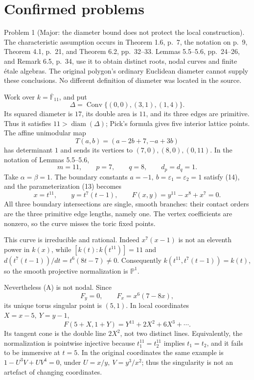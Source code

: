 \documentclass[10pt]{article}
\begin{document}
\section*{Confirmed problems}
Problem 1 (Major: the diameter bound does not protect the local construction).  The characteristic assumption occurs in Theorem 1.6, p. 7, the notation on p. 9, Theorem 4.1, p. 21, and Theorem 6.2, pp. 32–33. Lemmas 5.5–5.6, pp. 24–26, and Remark 6.5, p. 34, use it to obtain distinct roots, nodal curves and finite étale algebras. The original polygon’s ordinary Euclidean diameter cannot supply these conclusions. No different definition of diameter was located in the source.\par
Work over \(k=\overline{\mathbb F}_{11}\), and put \[\Delta=\operatorname{Conv}\{(0,0),(3,1),(1,4)\}.\] Its squared diameter is \(17\), its double area is \(11\), and its three edges are primitive. Thus it satisfies \(11>\operatorname{diam}(\Delta)\); Pick’s formula gives five interior lattice points. The affine unimodular map \[T(a,b)=(a-2b+7,-a+3b)\] has determinant \(1\) and sends its vertices to \((7,0),(8,0),(0,11)\). In the notation of Lemmas 5.5–5.6, \[m=11,\qquad p=7,\qquad q=8,\qquad d_p=d_q=1.\] Take \(\alpha=\beta=1\). The boundary constants \(a=-1,\ b=\varepsilon_1=\varepsilon_2=1\) satisfy (14), and the parameterization (13) becomes \[x=t^{11},\qquad y=t^7(t-1),\qquad
 F(x,y)=y^{11}-x^8+x^7=0.                         \tag{A}\] All three boundary intersections are single, smooth branches: their contact orders are the three primitive edge lengths, namely one. The vertex coefficients are nonzero, so the curve misses the toric fixed points.\par
This curve is irreducible and rational. Indeed \(x^7(x-1)\) is not an eleventh power in \(k(x)\), while \([k(t):k(t^{11})]=11\) and \(d(t^7(t-1))/dt=t^6(8t-7)\ne0\). Consequently \(k(t^{11},t^7(t-1))=k(t)\), so the smooth projective normalization is \(\mathbb P^1\).\par
Nevertheless (A) is not nodal. Since \[F_y=0,\qquad F_x=x^6(7-8x),\] its unique torus singular point is \((5,1)\). In local coordinates \(X=x-5,\ Y=y-1\), \[F(5+X,1+Y)=Y^{11}+2X^2+6X^3+\cdots .\] Its tangent cone is the double line \(2X^2\), not two distinct lines. Equivalently, the normalization is pointwise injective because \(t_1^{11}=t_2^{11}\) implies \(t_1=t_2\), and it fails to be immersive at \(t=5\). In the original coordinates the same example is \(1-U^3V+UV^4=0\), under \(U=x/y,\ V=y^3/x^2\); thus the singularity is not an artefact of changing coordinates.\par
\end{document}
